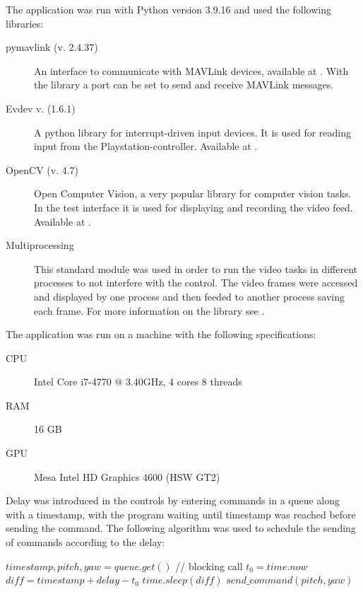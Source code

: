 \documentclass[nofilelist]{cslthse-msc}
\begin{document}
The application was run with Python version 3.9.16 and used the following libraries:
\begin{description} 
   \item [pymavlink (v. 2.4.37)]
   An interface to communicate with MAVLink devices, available at \cite{pymavlink}. With the library a port can be set to send and receive MAVLink messages.
 
   \item [Evdev v. (1.6.1)]
   A python library for interrupt-driven input devices. It is used for reading input from the Playstation-controller. Available at \cite{evdev}.

   \item [OpenCV (v. 4.7)] 
   Open Computer Vision, a very popular library for computer vision tasks. In the test interface it is used for displaying and recording the video feed. Available at \cite{opencv}.

   \item[Multiprocessing]
   This standard module was used in order to run the video tasks in different processes to not interfere with the control. The video frames were accessed and displayed by one process and then feeded to another process saving each frame. For more information on the library see \cite{multiprocessing}.  
\end{description}

The application was run on a machine with the following specifications:
\begin{description}
   \item[CPU] Intel Core i7-4770 @ 3.40GHz, 4 cores 8 threads
   \item[RAM] 16 GB
   \item[GPU] Mesa Intel HD Graphics 4600 (HSW GT2)
\end{description}

Delay was introduced in the controls by entering commands in a queue along with a timestamp, with the program waiting until timestamp was reached before sending the command. The following algorithm was used to schedule the sending of commands according to the delay:
\begin{algorithmic}
   \State $timestamp, pitch, yaw = queue.get()$ // blocking call
   \State $t_{0} = time.now$
   \State $diff = timestamp + delay - t_{0}$
      \State $time.sleep(diff)$
   \EndIf
   \State $send\_command(pitch, yaw)$
   \EndWhile
\end{algorithmic}
\end{document}

